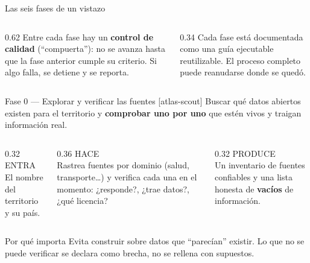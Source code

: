 \documentclass[aspectratio=169,11pt]{beamer}
\newcommand{\skilltag}[1]{{\color{tAccentD}\ttfamily\footnotesize[#1]}}
\newcommand{\lead}[1]{{\color{tPrimary}\large #1}\par\medskip}
\newcommand{\ehs}[3]{%
\begin{columns}[T]
  \begin{column}{0.32\textwidth}
    {\color{tMuted}\ttfamily\footnotesize ENTRA}\\[2pt]{\small #1}
  \end{column}
  \begin{column}{0.36\textwidth}
    {\color{tMuted}\ttfamily\footnotesize HACE}\\[2pt]{\small #2}
  \end{column}
  \begin{column}{0.32\textwidth}
    {\color{tMuted}\ttfamily\footnotesize PRODUCE}\\[2pt]{\small #3}
  \end{column}
\end{columns}}
\begin{document}
\begin{frame}{Las seis fases de un vistazo}
\centering\medskip
{}
\vfill
\begin{columns}[T]
\begin{column}{0.62\textwidth}
{\footnotesize\color{tBody} Entre cada fase hay un \textbf{control de calidad} (``compuerta''): no se avanza hasta que la fase anterior cumple su criterio. Si algo falla, se detiene y se reporta.}
\end{column}
\begin{column}{0.34\textwidth}
{\footnotesize\color{tMuted} Cada fase está documentada como una guía ejecutable reutilizable. El proceso completo puede reanudarse donde se quedó.}
\end{column}
\end{columns}
\end{frame}

\begin{frame}{Fase 0 — Explorar y verificar las fuentes \skilltag{atlas-scout}}
\lead{Buscar qué datos abiertos existen para el territorio y \textbf{comprobar uno por uno} que estén vivos y traigan información real.}
\ehs{El nombre del territorio y su país.}{Rastrea fuentes por dominio (salud, transporte\dots) y verifica cada una en el momento: ¿responde?, ¿trae datos?, ¿qué licencia?}{Un inventario de fuentes confiables y una lista honesta de \textbf{vacíos} de información.}
\vfill
\begin{block}{Por qué importa}
Evita construir sobre datos que ``parecían'' existir. Lo que no se puede verificar se declara como brecha, no se rellena con supuestos.
\end{block}
\end{frame}
\end{document}
